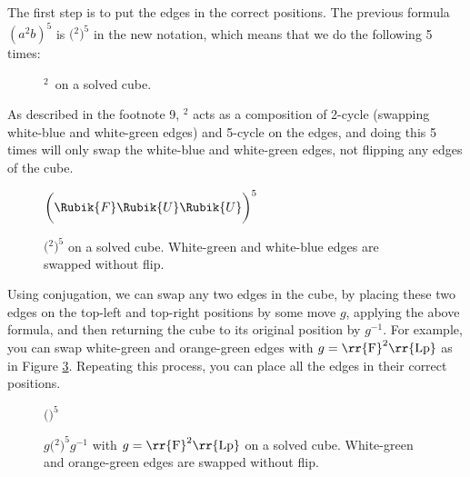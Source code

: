 The first step is to put the edges in the correct positions. The previous formula $(a^2 b)^5$ is $($${}^{2})^{5}$ in the new notation, which means that we do the following 5 times:

\begin{figure}[hbt]
    \centering%
    \RubikCubeSolvedWY%
    \caption{${}^{2}$\ on a solved cube.}
    \label{fig:U2F}
\end{figure}


As described in the footnote 9, ${}^{2}$ acts as a composition of 2-cycle (swapping white-blue and white-green edges) and 5-cycle on the edges, and doing this 5 times will only swap the white-blue and white-green edges, not flipping any edges of the cube.

\begin{figure}[hbt]
    \centering%
    \RubikCubeSolvedWY%
    $\bigg(\Rubik{F}\Rubik{U}\Rubik{U}\bigg)^{5}$
    \caption{$($${}^{2})^{5}$ on a solved cube. White-green and white-blue edges are swapped without flip.}
    \label{fig:swap-edge1}
\end{figure}

Using conjugation, we can swap any two edges in the cube, by placing these two edges on the top-left and top-right positions by some move $g$, applying the above formula, and then returning the cube to its original position by $g^{-1}$.
For example, you can swap white-green and orange-green edges with $g=\text{\rr{F}}^{2}\text{\rr{Lp}}$ as in Figure \ref{fig:swap-edge2}.
Repeating this process, you can place all the edges in their correct positions.

\begin{figure}[hbt]
    \centering%
    \RubikCubeSolvedWY%
    $\bigg($$\bigg)^{5}$%
    \caption{$g($${}^{2})^{5}g^{-1}$ with $g = \text{\rr{F}}^{2}\text{\rr{Lp}}$ on a solved cube. White-green and orange-green edges are swapped without flip.}
    \label{fig:swap-edge2}
\end{figure}


